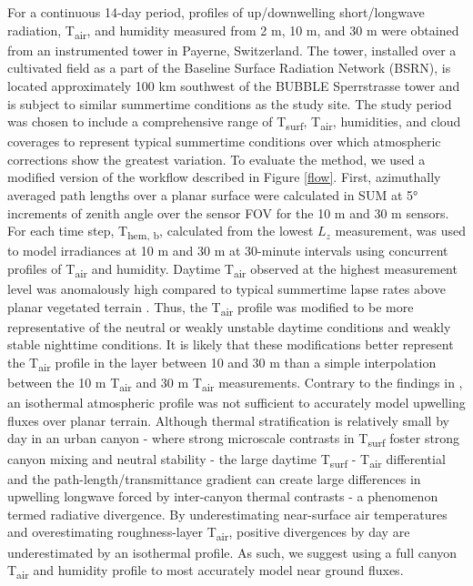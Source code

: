 For a continuous 14-day period, profiles of up/downwelling short/longwave radiation, T\textsubscript{air}, and humidity measured from 2 \si{m}, 10 \si{m}, and 30 \si{m} were obtained from an instrumented tower in Payerne, Switzerland. The tower, installed over a cultivated field as a part of the Baseline Surface Radiation Network (BSRN), is located approximately 100 \si{\kilo\meter} southwest of the BUBBLE Sperrstrasse tower and is subject to similar summertime conditions as the study site. The study period was chosen to include a comprehensive range of T\textsubscript{surf}, T\textsubscript{air}, humidities, and cloud coverages to represent typical summertime conditions over which atmospheric corrections show the greatest variation. To evaluate the method, we used a modified version of the workflow described in Figure \ref{flow}. First, azimuthally averaged path lengths over a planar surface were calculated in SUM at 5\si{\degree} increments of zenith angle over the sensor FOV for the 10 \si{\meter} and 30 \si{\meter} sensors. For each time step, T\textsubscript{hem, b}, calculated from the lowest $L_z$ measurement, was used to model irradiances at 10 \si{m} and 30 \si{m} at 30-minute intervals using concurrent profiles of T\textsubscript{air} and humidity. Daytime T\textsubscript{air} observed at the highest measurement level was anomalously high compared to typical summertime lapse rates above planar vegetated terrain \citep{Oke1987}. Thus, the T\textsubscript{air} profile was modified to be more representative of the neutral or weakly unstable daytime conditions and weakly stable nighttime conditions. It is likely that these modifications better represent the T\textsubscript{air} profile in the layer between 10 and 30 \si{\meter} than a simple interpolation between the 10 \si{\meter} T\textsubscript{air} and 30 \si{\meter} T\textsubscript{air} measurements. Contrary to the findings in \citet{Kotani2009a}, an isothermal atmospheric profile was not sufficient to accurately model upwelling fluxes over planar terrain. Although thermal stratification is relatively small by day in an urban canyon \citep{Nakamura1988} - where strong microscale contrasts in T\textsubscript{surf} foster strong canyon mixing and neutral stability - the large daytime T\textsubscript{surf} - T\textsubscript{air} differential and the path-length/transmittance gradient can create large differences in upwelling longwave forced by inter-canyon thermal contrasts - a phenomenon termed radiative divergence. By underestimating near-surface air temperatures and overestimating roughness-layer T\textsubscript{air}, positive divergences by day are underestimated by an isothermal profile. As such, we suggest using a full canyon T\textsubscript{air} and humidity profile to most accurately model near ground fluxes.


